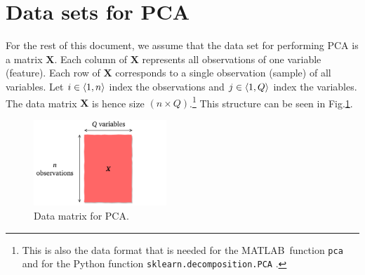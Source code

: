 \documentclass[10pt,twocolumn]{article}
\begin{document}
%
%
%
%
%
%
%

\section{Data sets for PCA}

For the rest of this document, we assume that the data set for performing PCA is a matrix $\bm{X}$. Each column of $\bm{X}$ represents all observations of one variable (feature). Each row of $\bm{X}$ corresponds to a single observation (sample) of all variables. Let $i \in \braket{1, n}$ index the observations and $j \in \braket{1, Q}$ index the variables. The data matrix $\bm{X}$ is hence size $(n \times Q)$.\footnote{This is also the data format that is needed for the MATLAB\textregistered \, function \texttt{pca} \cite{Matlab-pca} and for the Python function \texttt{sklearn.decomposition.PCA} \cite{Python-pca}.} This structure can be seen in Fig.\ref{fig:data-matrix}.


\begin{figure}[H]
\centering\includegraphics[width=5cm]{data-set-PCA.png}
\caption{Data matrix for PCA.}
\label{fig:data-matrix}
\end{figure}
\end{document}
